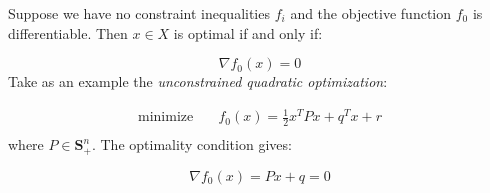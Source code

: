 Suppose we have no constraint inequalities $f_i$ and the objective function $f_0$ is differentiable. Then $x \in X$ is optimal if and only if:

\begin{equation}
    \nabla f_0 (x)= 0
\end{equation}
%
Take as an example the \textit{unconstrained quadratic optimization}:

\begin{equation}
    \begin{aligned}
        \text{minimize} & \quad f_0(x) = \frac{1}{2} x^T P x + q^T x + r\\
    \end{aligned}
\end{equation}
%
where $P \in \mathbf{S}_+^n$. The optimality condition gives:

\begin{equation}
    \nabla f_0(x) = P x + q = 0
\end{equation}